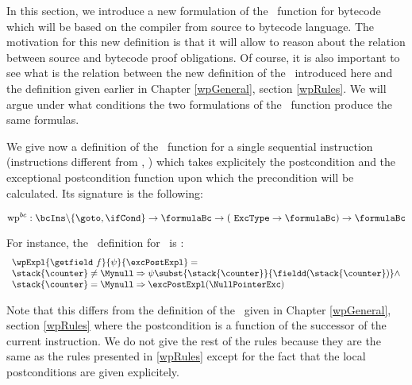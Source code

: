 


\newtheorem{wpSeq}{Definition}[section]
\newtheorem{wpExpr}[wpSeq]{Definition}


In this section, we introduce a new formulation of the \wpName \ function  for bytecode 
which will be based on the compiler from source to bytecode  language.
The motivation for this new definition is that it will allow to reason about the
 relation between source and bytecode proof
obligations. 
Of course, it is also important to see what is the relation between the new definition
of the \wpName \ introduced here and the definition  given earlier in Chapter \ref{wpGeneral}, section \ref{wpRules}. 
We will argue under what conditions the two formulations of the \wpName \ function produce the same formulas.




We give now a definition of the \wpName \ function for a single sequential instruction (instructions different from \goto, \ifCond) which takes
explicitely the postcondition and the exceptional postcondition function 
upon which the precondition will be calculated. Its signature is the following:

$$ \mbox{\rm\textrm{wp}}^{bc} : \bcIns \backslash \{ \goto , \ifCond \}  \rightarrow \formulaBc \rightarrow ( \mbox{ \rm \texttt{ExcType}} \rightarrow \formulaBc ) \rightarrow \formulaBc$$

For instance, the \wpName \ definition for \getfield \ is :
$$ \begin{array}{l} \wpExpl{\getfield \ f }{ \psi  }{ \excPostExpl} = \\
		         \stack{\counter } \neq \Mynull \Rightarrow 
			                \psi   \subst{ \stack{\counter} }{ \fieldd(\stack{\counter})} 		                    
			  \wedge \\
			  \stack{\counter }  = \Mynull  \Rightarrow   \excPostExpl( \NullPointerExc )
			  \end{array}$$ 

Note that this differs from the definition of the \wpName \  given in Chapter \ref{wpGeneral}, section \ref{wpRules} where the postcondition 
is a function of the successor of the current instruction. We do not give the rest of the rules because they are the same as 
the rules presented in \ref{wpRules} except for the fact that the local postconditions are given explicitely.


